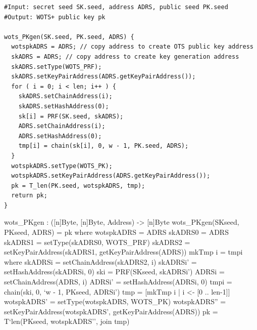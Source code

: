 \begin{lstlisting}[label=alg:wots_pkgen, language=pseudoc,
                   caption=\texttt{wots\_PKgen} -- Generating a \wotsp public key.]
#Input: secret seed SK.seed, address ADRS, public seed PK.seed
#Output: WOTS+ public key pk

wots_PKgen(SK.seed, PK.seed, ADRS) {
  wotspkADRS = ADRS; // copy address to create OTS public key address
  skADRS = ADRS; // copy address to create key generation address
  skADRS.setType(WOTS_PRF);
  skADRS.setKeyPairAddress(ADRS.getKeyPairAddress());
  for ( i = 0; i < len; i++ ) {
    skADRS.setChainAddress(i);
    skADRS.setHashAddress(0);
    sk[i] = PRF(SK.seed, skADRS);
    ADRS.setChainAddress(i);
    ADRS.setHashAddress(0);
    tmp[i] = chain(sk[i], 0, w - 1, PK.seed, ADRS);
  }
  wotspkADRS.setType(WOTS_PK);
  wotspkADRS.setKeyPairAddress(ADRS.getKeyPairAddress());
  pk = T_len(PK.seed, wotspkADRS, tmp);
  return pk;
} 
\end{lstlisting} 

\begin{code}
  wots_PKgen : ([n]Byte, [n]Byte, Address) -> [n]Byte
  wots_PKgen(SKseed, PKseed, ADRS) = pk where
    wotspkADRS = ADRS
    skADRS0 = ADRS
    skADRS1 = setType(skADRS0, WOTS_PRF)
    skADRS2 = setKeyPairAddress(skADRS1, getKeyPairAddress(ADRS))
    mkTmp i = tmpi where
      skADRSi = setChainAddress(skADRS2, i)
      skADRSi' = setHashAddress(skADRSi, 0)
      ski = PRF(SKseed, skADRSi')
      ADRSi = setChainAddress(ADRS, i)
      ADRSi' = setHashAddress(ADRSi, 0)
      tmpi = chain(ski, 0, `w - 1, PKseed, ADRSi')
    tmp = [mkTmp i | i <- [0 .. len-1]]
    wotspkADRS' = setType(wotspkADRS, WOTS_PK)
    wotspkADRS'' = setKeyPairAddress(wotspkADRS', getKeyPairAddress(ADRS))
    pk = T`{len}(PKseed, wotspkADRS'', join tmp)
\end{code}

